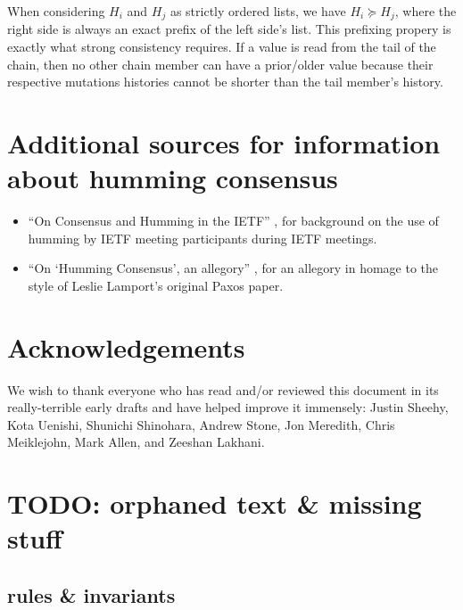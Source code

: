 \documentclass[preprint,10pt]{sigplanconf}
\begin{document}
When considering $H_i$ and $H_j$ as strictly ordered lists, we have 
$H_i \succeq H_j$, where the right side is always an exact prefix of the left
side's list.  This prefixing propery is exactly what strong
consistency requires.  If a value is read from the tail of the chain,
then no other chain member can have a prior/older value because their
respective mutations histories cannot be shorter than the tail
member's history.

\section{Additional sources for information about humming consensus}

\begin{itemize}
\item ``On Consensus and Humming in the IETF'' \cite{rfc-7282}, for
background on the use of humming by IETF meeting participants during
IETF meetings.

\item ``On `Humming Consensus', an allegory'' \cite{humming-consensus-allegory},
for an allegory in homage to the style of Leslie Lamport's original Paxos
paper.
\end{itemize}

\section{Acknowledgements}

We wish to thank everyone who has read and/or reviewed this document
in its really-terrible early drafts and have helped improve it
immensely: Justin Sheehy, Kota Uenishi, Shunichi Shinohara, Andrew
Stone, Jon Meredith, Chris Meiklejohn, Mark Allen, and Zeeshan
Lakhani.

\section{TODO: orphaned text \& missing stuff}

\subsection{rules \& invariants}
\label{sub:humming-rules-and-invariants}
\end{document}
